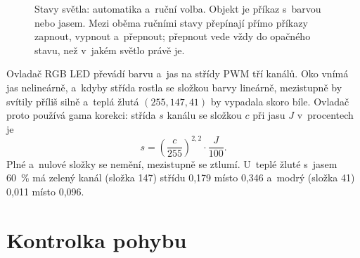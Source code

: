 \begin{figure}[H]
\centering
{}
\caption[Stavy světla: automatika a~ruční volba]{Stavy světla: automatika a~ruční volba. Objekt
je příkaz s~barvou nebo jasem. Mezi oběma ručními stavy přepínají přímo příkazy zapnout, vypnout
a~přepnout; přepnout vede vždy do opačného stavu, než v~jakém světlo právě je.}
\label{fig:svetlo}
\end{figure}

Ovladač RGB LED převádí barvu a~jas na střídy PWM tří kanálů. Oko vnímá jas nelineárně, a~kdyby
střída rostla se složkou barvy lineárně, mezistupně by svítily příliš silně a~teplá žlutá
$(255, 147, 41)$ by vypadala skoro bíle. Ovladač proto používá gama korekci: střída $s$ kanálu
se složkou $c$ při jasu $J$ v~procentech je
\begin{equation}
  s = \left(\frac{c}{255}\right)^{2{,}2} \cdot \frac{J}{100}.
\end{equation}
Plné a~nulové složky se nemění, mezistupně se ztlumí. U~teplé žluté s~jasem 60~\% má zelený
kanál (složka 147) střídu 0,179 místo 0,346 a~modrý (složka 41) 0,011 místo 0,096.

\section{Kontrolka pohybu}
\label{sec:kontrolka}

